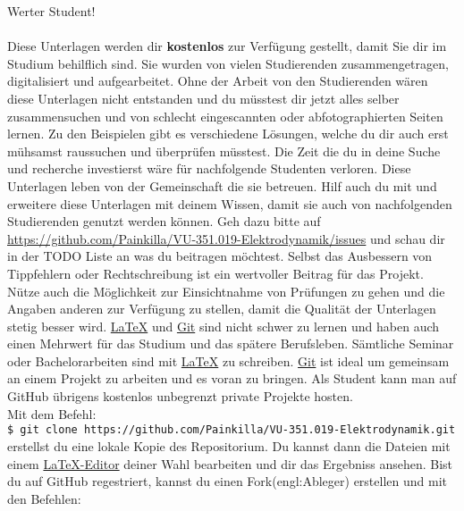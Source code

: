 \documentclass[12pt]{article} %
\numberwithin{equation}{subsection}
\begin{document}
	
	\tableofcontents %
	
	\newpage %
	Werter Student!\\
	\\
	Diese Unterlagen werden dir \textbf{kostenlos} zur Verfügung gestellt, damit Sie dir im Studium behilflich sind. Sie wurden von vielen Studierenden zusammengetragen, digitalisiert und aufgearbeitet. Ohne der Arbeit von den Studierenden wären diese Unterlagen nicht entstanden und du müsstest dir jetzt alles selber zusammensuchen und von schlecht eingescannten oder abfotographierten Seiten lernen. Zu den Beispielen gibt es verschiedene Lösungen, welche du dir auch erst mühsamst raussuchen und überprüfen müsstest. Die Zeit die du in deine Suche und recherche investierst wäre für nachfolgende Studenten verloren. Diese Unterlagen leben von der Gemeinschaft die sie betreuen. Hilf auch du mit und erweitere diese Unterlagen mit deinem Wissen, damit sie auch von nachfolgenden Studierenden genutzt werden können. Geh dazu bitte auf \href{https://github.com/Painkilla/VU-351.019-Elektrodynamik/issues}{https://github.com/Painkilla/VU-351.019-Elektrodynamik/issues} und schau dir in der TODO Liste an was du beitragen möchtest. Selbst das Ausbessern von Tippfehlern oder Rechtschreibung ist ein wertvoller Beitrag für das Projekt. Nütze auch die Möglichkeit zur Einsichtnahme von Prüfungen zu gehen und die Angaben anderen zur Verfügung zu stellen, damit die Qualität der Unterlagen stetig besser wird. \href{https://www.latex-project.org/get/}{\LaTeX} und \href{https://git-scm.com/downloads}{Git} sind nicht schwer zu lernen und haben auch einen Mehrwert für das Studium und das spätere Berufsleben. Sämtliche Seminar oder Bachelorarbeiten sind mit \href{https://www.latex-project.org/get/}{\LaTeX} zu schreiben. \href{https://git-scm.com/downloads}{Git} ist ideal um gemeinsam an einem Projekt zu arbeiten und es voran zu bringen. Als Student kann man auf GitHub übrigens kostenlos unbegrenzt private Projekte hosten.\\
	Mit dem Befehl:\\
	\texttt{\$ git clone https://github.com/Painkilla/VU-351.019-Elektrodynamik.git}\\
	erstellst du eine lokale Kopie des Repositorium. Du kannst dann die Dateien mit einem \href{https://www.latex-project.org/get/}{\LaTeX-Editor} deiner Wahl bearbeiten und dir das Ergebniss ansehen. Bist du auf GitHub regestriert, kannst du einen Fork(engl:Ableger) erstellen und mit den Befehlen:\\
\end{document}
